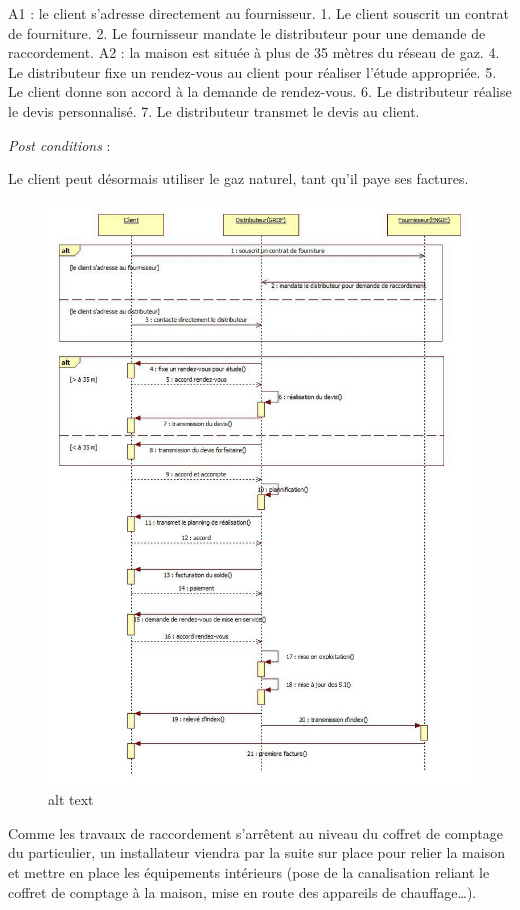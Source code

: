 \documentclass[
12pt,
french,                           %
a4paper,
]{article}
\begin{document}
A1 : le client s'adresse directement au fournisseur. 1. Le client
souscrit un contrat de fourniture. 2. Le fournisseur mandate le
distributeur pour une demande de raccordement. A2 : la maison est située
à plus de 35 mètres du réseau de gaz. 4. Le distributeur fixe un
rendez-vous au client pour réaliser l'étude appropriée. 5. Le client
donne son accord à la demande de rendez-vous. 6. Le distributeur réalise
le devis personnalisé. 7. Le distributeur transmet le devis au client.

\emph{Post conditions} :

Le client peut désormais utiliser le gaz naturel, tant qu'il paye ses
factures.

\begin{figure}[htbp]
\centering
\includegraphics{sequenceraccordement.jpg}
\caption{alt text}
\end{figure}

Comme les travaux de raccordement s'arrêtent au niveau du coffret de
comptage du particulier, un installateur viendra par la suite sur place
pour relier la maison et mettre en place les équipements intérieurs
(pose de la canalisation reliant le coffret de comptage à la maison,
mise en route des appareils de chauffage\ldots{}).
\end{document}
